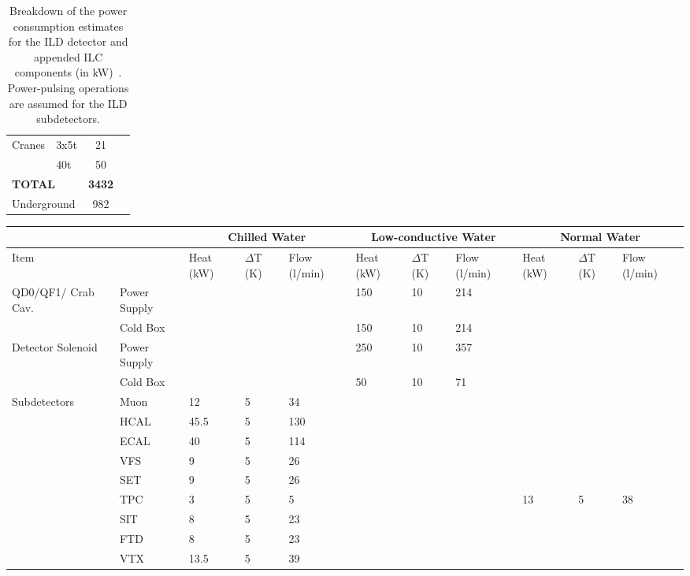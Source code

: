 \begin{table}[htb]
\begin{tabular}{l|l|c|c|c|c}
        \multirow{2}{*}{Cranes} & 3x5t & 21 & \multicolumn{3}{l}{}\\
        & 40t & 50 & \multicolumn{3}{l}{}\\ \hline
        \multicolumn{2}{l|}{{\bf TOTAL}}& {\bf 3432} & \multicolumn{3}{l}{}\\ \hline
        \multicolumn{2}{l|}{Underground}& 982 & \multicolumn{3}{l}{}\\ \hline
    \end{tabular}
    \caption{Breakdown of the power consumption estimates for the ILD detector and appended ILC components (in kW)~\cite{ild:bib:services}. Power-pulsing operations are assumed for the ILD subdetectors.}
    \label{tab:integration:power}
\end{table}

\begin{table}[]
    \centering
    \begin{tabular}{m{1.4cm}|m{1.7cm}|m{0.6cm}|m{0.6cm}|m{0.7cm}|m{0.6cm}|m{0.6cm}|m{0.7cm}|m{0.6cm}|m{0.6cm}|m{0.7cm}}
    \multicolumn{2}{m{1.4cm}|}{}& \multicolumn{3}{c|}{Chilled Water} & \multicolumn{3}{c|}{Low-conductive Water} & \multicolumn{3}{c}{Normal Water} \\ \hline
    \multicolumn{2}{m{1.4cm}|}{Item} & Heat (kW) & $\Delta$T (K) & Flow (l/min) & Heat (kW) & $\Delta$T (K) & Flow (l/min) & Heat (kW) & $\Delta$T (K) &Flow (l/min) \\ \hline
    \multirow{2}{1.4cm}{QD0/QF1/ Crab Cav.} & Power Supply & & & & 150 & 10 & 214 & & & \\
    & Cold Box & & & & 150 & 10 & 214 & & & \\\hline
    \multirow{2}{1.4cm}{Detector Solenoid} & Power Supply & & & & 250 & 10 & 357 & & & \\
    & Cold Box & & & & 50 & 10 & 71 & & & \\\hline
    \multirow{9}{1.4cm}{Subdetectors} & Muon & 12 & 5 & 34 & & & & & \\
    & HCAL & 45.5 & 5 & 130 & & & & & & \\
    & ECAL & 40 & 5 & 114 & & & & & & \\
    & VFS & 9 & 5 & 26 & & & & & & \\
    & SET & 9 & 5 & 26 & & & & & & \\
    & TPC & 3 & 5 & 5 & & & & 13 & 5 & 38\\
    & SIT & 8 & 5 & 23 & & & & & & \\
    & FTD & 8 & 5 & 23 & & & & & & \\
    & VTX & 13.5 & 5 & 39 & & & & & & \\\hline

\end{tabular}
\end{table}
